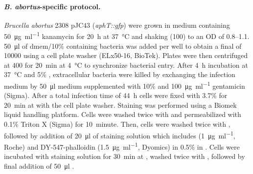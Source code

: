 \paragraph{\textit{B. abortus}-specific protocol.}
\textit{Brucella abortus} 2308 pJC43 (\textit{aphT::\acrshort{gfp}}) \citep{Celli2005} were grown in  medium containing \SI{50}{\micro\gram\per\milli\litre} kanamycin for \SI{20}{\hour} at \SI{37}{\celsius} and shaking (\SI{100}{\rpm}) to an OD of 0.8--1.1. \SI{50}{\micro\litre} of \acrshort{dmem}\slash 10\% containing bacteria was added per well to obtain a final  of 10000 using a cell plate washer (ELx50-16, BioTek). Plates were then centrifuged at \SI{400}{\gravity} for \SI{20}{\minute} at \SI{4}{\celsius} to synchronize bacterial entry. After \SI{4}{\hour} incubation at \SI{37}{\celsius} and 5\% , extracellular bacteria were killed by exchanging the infection medium by \SI{50}{\micro\litre} medium supplemented with 10\%  and \SI{100}{\micro\gram\per\milli\litre} gentamicin (Sigma). After a total infection time of \SI{44}{\hour} cells were fixed with 3.7\%  for \SI{20}{\minute} at  with the cell plate washer. Staining was performed using a Biomek liquid handling platform. Cells were washed twice with  and permeabilized with 0.1\% Triton X (Sigma) for \SI{10}{minute}. Then, cells were washed twice with , followed by addition of \SI{20}{\micro\litre} of staining solution which includes  (\SI{1}{\micro\gram\per\milli\litre}, Roche) and DY-547-phalloidin (\SI{1.5}{\micro\gram\per\milli\litre}, Dyomics) in 0.5\%  in . Cells were incubated with staining solution for \SI{30}{\minute} at , washed twice with , followed by final addition of \SI{50}{\micro\litre} .

